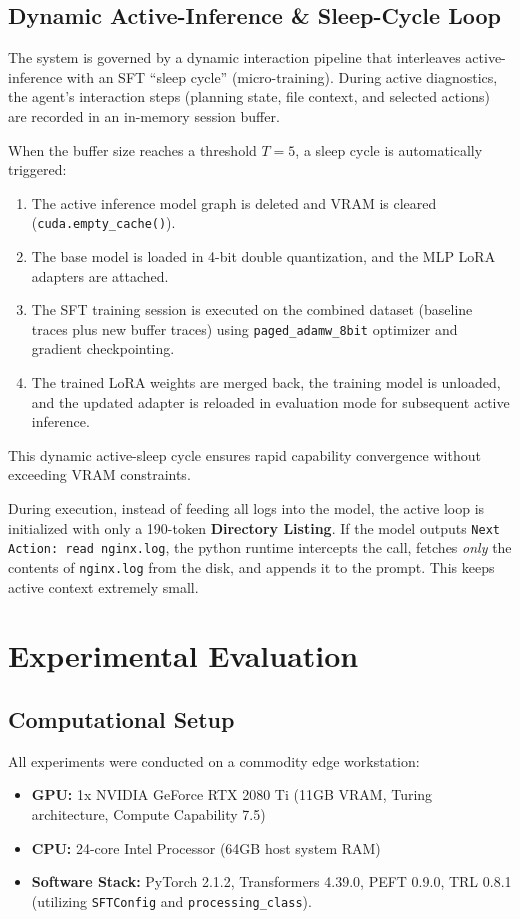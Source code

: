 \documentclass[10pt,twocolumn]{article}
\begin{document}
\subsection{Dynamic Active-Inference \& Sleep-Cycle Loop}
The system is governed by a dynamic interaction pipeline that interleaves active-inference with an SFT ``sleep cycle'' (micro-training). During active diagnostics, the agent's interaction steps (planning state, file context, and selected actions) are recorded in an in-memory session buffer.

When the buffer size reaches a threshold $T = 5$, a sleep cycle is automatically triggered:
\begin{enumerate}
    \item The active inference model graph is deleted and VRAM is cleared (\texttt{cuda.empty\_cache()}).
    \item The base model is loaded in 4-bit double quantization, and the MLP LoRA adapters are attached.
    \item The SFT training session is executed on the combined dataset (baseline traces plus new buffer traces) using \texttt{paged\_adamw\_8bit} optimizer and gradient checkpointing.
    \item The trained LoRA weights are merged back, the training model is unloaded, and the updated adapter is reloaded in evaluation mode for subsequent active inference.
\end{enumerate}
This dynamic active-sleep cycle ensures rapid capability convergence without exceeding VRAM constraints.

During execution, instead of feeding all logs into the model, the active loop is initialized with only a 190-token \textbf{Directory Listing}. If the model outputs \texttt{Next Action: read nginx.log}, the python runtime intercepts the call, fetches \textit{only} the contents of \texttt{nginx.log} from the disk, and appends it to the prompt. This keeps active context extremely small.

\section{Experimental Evaluation}

\subsection{Computational Setup}
All experiments were conducted on a commodity edge workstation:
\begin{itemize}
    \item \textbf{GPU:} 1x NVIDIA GeForce RTX 2080 Ti (11GB VRAM, Turing architecture, Compute Capability 7.5)
    \item \textbf{CPU:} 24-core Intel Processor (64GB host system RAM)
    \item \textbf{Software Stack:} PyTorch 2.1.2, Transformers 4.39.0, PEFT 0.9.0, TRL 0.8.1 (utilizing \texttt{SFTConfig} and \texttt{processing\_class}).
\end{itemize}
\end{document}
